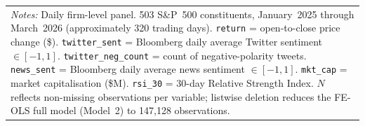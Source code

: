 \begin{table}[htbp]
\begin{tabular}{lrrrrr}
\hline\hline
\multicolumn{6}{p{0.98\linewidth}}{\footnotesize \textit{Notes:} Daily firm-level panel. 503 S\&P~500 constituents, January~2025 through March~2026 (approximately 320 trading days). \texttt{return} = open-to-close price change (\$). \texttt{twitter\_sent} = Bloomberg daily average Twitter sentiment $\in [-1,1]$. \texttt{twitter\_neg\_count} = count of negative-polarity tweets. \texttt{news\_sent} = Bloomberg daily average news sentiment $\in [-1,1]$. \texttt{mkt\_cap} = market capitalisation (\$M). \texttt{rsi\_30} = 30-day Relative Strength Index. $N$ reflects non-missing observations per variable; listwise deletion reduces the FE-OLS full model (Model~2) to 147,128 observations.} \\
\end{tabular}
\end{table}
